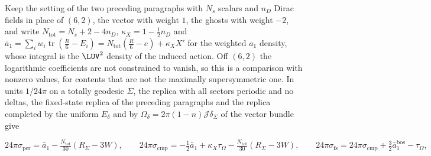 Keep the setting of the two preceding paragraphs with \(N_s\) scalars and \(n_D\) Dirac fields in place of \((6,2)\), the vector with weight \(1\), the ghosts with weight \(-2\), and write \(N_{\mathrm{tot}}=N_s+2-4n_D\), \(\kappa_X=1-\tfrac12n_D\) and \(\bar a_1=\sum_iw_i\operatorname{tr}(\tfrac R6-E_i)=N_{\mathrm{tot}}(\tfrac R6-e)+\kappa_XX'\) for the weighted \(a_1\) density, whose integral is the \(\LUV^2\) density of the induced action. Off \((6,2)\) the logarithmic coefficients are not constrained to vanish, so this is a comparison with nonzero values, for contents that are not the maximally supersymmetric one. In units \(1/24\pi\) on a totally geodesic \(\Sigma\), the replica with all sectors periodic and no deltas, the fixed-state replica of the preceding paragraphs and the replica completed by the uniform \(E_\delta\) and by \(\Omega_\delta=2\pi(1-n)\mathcal J\delta_\Sigma\) of the vector bundle give

\[

  24\pi\sigma_{\mathrm{per}}=\bar a_1-\tfrac{N_{\mathrm{tot}}}{30}(R_\Sigma-3W),\qquad

  24\pi\sigma_{\mathrm{cmp}}=-\tfrac12\bar a_1+\kappa_X\tau_\Omega-\tfrac{N_{\mathrm{tot}}}{30}(R_\Sigma-3W),\qquad

  24\pi\sigma_{\mathrm{fs}}=24\pi\sigma_{\mathrm{cmp}}+\tfrac32\bar a_1^{\mathrm{bos}}-\tau_\Omega ,

\]

